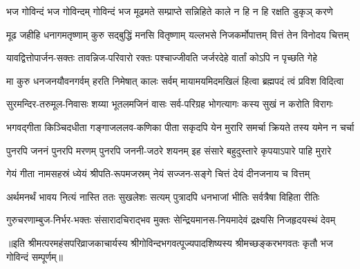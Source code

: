 \setlength{\shlokaspaceskip}{6pt}
\setlength{\columnseprule}{0pt}
\setlength{\columnsep}{10pt}
\begin{large}
\begin{multicols}{2}
\begin{flushleft}
\fourlineindentedshloka
{भज गोविन्दं भज गोविन्दम्}
{गोविन्दं भज मूढमते}
{सम्प्राप्ते सन्निहिते काले}
{न हि न हि रक्षति डुकृञ् करणे}

\fourlineindentedshloka
{मूढ जहीहि धनागमतृष्णाम्}
{कुरु सद्बुद्धिं मनसि वितृष्णाम्}
{यल्लभसे निजकर्मोपात्तम्}
{वित्तं तेन विनोदय चित्तम्}

\fourlineindentedshloka
{यावद्वित्तोपार्जन-सक्तः}
{तावन्निज-परिवारो रक्तः}
{पश्चाज्जीवति जर्जरदेहे}
{वार्तां कोऽपि न पृच्छति गेहे}

\fourlineindentedshloka
{मा कुरु धनजनयौवनगर्वम्}
{हरति निमेषात् कालः सर्वम्}
{मायामयमिदमखिलं हित्वा}
{ब्रह्मपदं त्वं प्रविश विदित्वा}

\fourlineindentedshloka
{सुरमन्दिर-तरुमूल-निवासः}
{शय्या भूतलमजिनं वासः}
{सर्व-परिग्रह भोगत्यागः}
{कस्य सुखं न करोति विरागः}

\fourlineindentedshloka
{भगवद्गीता किञ्चिदधीता}
{गङ्गाजललव-कणिका पीता}
{सकृदपि येन मुरारि समर्चा}
{क्रियते तस्य यमेन न चर्चा}

\fourlineindentedshloka
{पुनरपि जननं पुनरपि मरणम्}
{पुनरपि जननी-जठरे शयनम्}
{इह संसारे बहुदुस्तारे}
{कृपयाऽपारे पाहि मुरारे}

\fourlineindentedshloka
{गेयं गीता नामसहस्रं}
{ध्येयं श्रीपति-रूपमजस्रम्}
{नेयं सज्जन-सङ्गे चित्तं}
{देयं दीनजनाय च वित्तम्}

\fourlineindentedshloka
{अर्थमनर्थं भावय नित्यं}
{नास्ति ततः सुखलेशः सत्यम्}
{पुत्रादपि धनभाजां भीतिः}
{सर्वत्रैषा विहिता रीतिः}

\fourlineindentedshloka
{गुरुचरणाम्बुज-निर्भर-भक्तः}
{संसारादचिराद्भव मुक्तः}
{सेन्द्रियमानस-नियमादेवं}
{द्रक्ष्यसि निजहृदयस्थं देवम्}

\end{flushleft}
\end{multicols}
॥इति श्रीमत्परमहंसपरिव्राजकाचार्यस्य श्रीगोविन्दभगवत्पूज्यपादशिष्यस्य 
श्रीमच्छङ्करभगवतः कृतौ भज गोविन्दं सम्पूर्णम्॥
\end{large}
\setlength{\shlokaspaceskip}{24pt}
\setlength{\columnseprule}{1pt}
\setlength{\columnsep}{30pt}